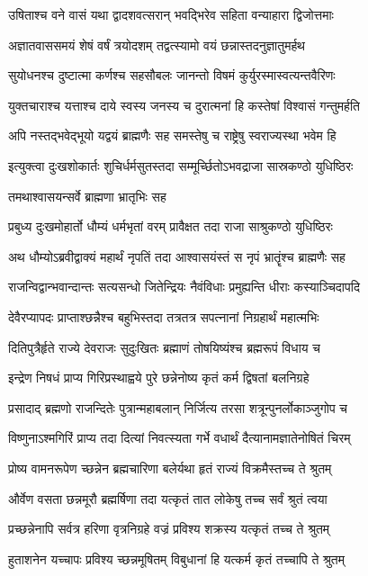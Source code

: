 \twolineshloka
{उषिताश्च वने वासं यथा द्वादशवत्सरान्}
{भवद्भिरेव सहिता वन्याहारा द्विजोत्तमाः}


\twolineshloka
{अज्ञातवाससमयं शेषं वर्षं त्रयोदशम्}
{तद्वत्स्यामो वयं छन्नास्तदनुज्ञातुमर्हथ}


\twolineshloka
{सुयोधनश्च दुष्टात्मा कर्णश्च सहसौबलः}
{जानन्तो विषमं कुर्युरस्मास्वत्यन्तवैरिणः}


\twolineshloka
{युक्तचाराश्च यत्ताश्च दाये स्वस्य जनस्य च}
{दुरात्मनां हि कस्तेषां विश्वासं गन्तुमर्हति}


\twolineshloka
{अपि नस्तद्भवेद्भूयो यद्वयं ब्राह्मणैः सह}
{समस्तेषु च राष्ट्रेषु स्वराज्यस्था भवेम हि}


\twolineshloka
{इत्युक्त्वा दुःखशोकार्तः शुचिर्धर्मसुतस्तदा}
{सम्मूर्च्छितोऽभवद्राजा सास्रकण्ठो युधिष्ठिरः}


\onelineshloka
{तमथाश्वासयन्सर्वे ब्राह्मणा भ्रातृभिः सह}

\twolineshloka
{प्रबुध्य दुःखमोहार्तो धौम्यं धर्मभृतां वरम्}
{प्रावैक्षत तदा राजा साश्रुकण्ठो युधिष्ठिरः}


\twolineshloka
{अथ धौम्योऽब्रवीद्वाक्यं महार्थं नृपतिं तदा}
{आश्वासयंस्तं स नृपं भ्रातॄंश्च ब्राह्मणैः सह}


\twolineshloka
{राजन्विद्वान्भवान्दान्तः सत्यसन्धो जितेन्द्रियः}
{नैवंविधाः प्रमुह्यन्ति धीराः कस्याञ्चिदापदि}


\twolineshloka
{देवैरप्यापदः प्राप्ताश्छन्नैश्च बहुभिस्तदा}
{तत्रतत्र सपत्नानां निग्रहार्थं महात्मभिः}


\twolineshloka
{दितिपुत्रैर्हृते राज्ये देवराजः सुदुःखितः}
{ब्रह्माणं तोषयिष्यंश्च ब्रह्मरूपं विधाय च}


\twolineshloka
{इन्द्रेण निषधं प्राप्य गिरिप्रस्थाह्वये पुरे}
{छन्नेनोष्य कृतं कर्म द्विषतां बलनिग्रहे}


\twolineshloka
{प्रसादाद् ब्रह्मणो राजन्दितेः पुत्रान्महाबलान्}
{निर्जित्य तरसा शत्रून्पुनर्लोकाञ्जुगोप च}


\twolineshloka
{विष्णुनाऽश्मगिरिं प्राप्य तदा दित्यां निवत्स्यता}
{गर्भे वधार्थं दैत्यानामज्ञातेनोषितं चिरम्}


\twolineshloka
{प्रोष्य वामनरूपेण च्छन्नेन ब्रह्मचारिणा}
{बलेर्यथा हृतं राज्यं विक्रमैस्तच्च ते श्रुतम्}


\twolineshloka
{और्वेण वसता छन्नमूरौ ब्रह्मर्षिणा तदा}
{यत्कृतं तात लोकेषु तच्च सर्वं श्रुतं त्वया}


\twolineshloka
{प्रच्छन्नेनापि सर्वत्र हरिणा वृत्रनिग्रहे}
{वज्रं प्रविश्य शक्रस्य यत्कृतं तच्च ते श्रुतम्}


\twolineshloka
{हुताशनेन यच्चापः प्रविश्य च्छन्नमूषितम्}
{विबुधानां हि यत्कर्म कृतं तच्चापि ते श्रुतम्}



